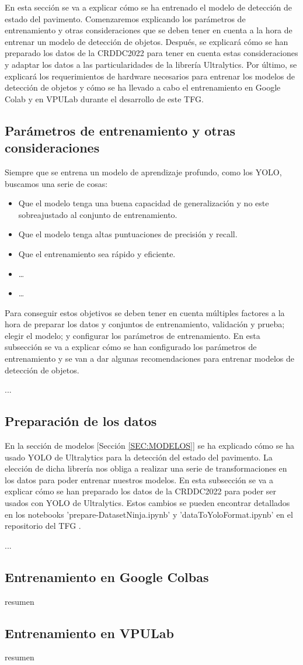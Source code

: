 En esta sección se va a explicar cómo se ha entrenado el modelo de detección de estado del pavimento. Comenzaremos explicando los parámetros de entrenamiento y otras consideraciones que se deben tener en cuenta a la hora de entrenar un modelo de detección de objetos. Después, se explicará cómo se han preparado los datos de la CRDDC2022 para tener en cuenta estas consideraciones y adaptar los datos a las particularidades de la librería Ultralytics. Por último, se explicará los requerimientos de hardware necesarios para entrenar los modelos de detección de objetos y cómo se ha llevado a cabo el entrenamiento en Google Colab y en VPULab durante el desarrollo de este TFG.

\subsection{Parámetros de entrenamiento y otras consideraciones}
Siempre que se entrena un modelo de aprendizaje profundo, como los YOLO, buscamos una serie de cosas:
\begin{itemize}
    \item Que el modelo tenga una buena capacidad de generalización y no este sobreajustado al conjunto de entrenamiento.
    \item Que el modelo tenga altas puntuaciones de precisión y recall.
    \item Que el entrenamiento sea rápido y eficiente.
    \item \dots
    \item \dots
\end{itemize}
Para conseguir estos objetivos se deben tener en cuenta múltiples factores a la hora de preparar los datos y conjuntos de entrenamiento, validación y prueba; elegir el modelo; y configurar los parámetros de entrenamiento. En esta subsección se va a explicar cómo se han configurado los parámetros de entrenamiento y se van a dar algunas recomendaciones para entrenar modelos de detección de objetos.

...

\subsection{Preparación de los datos}
En la sección de modelos [Sección \ref{SEC:MODELOS}] se ha explicado cómo se ha usado YOLO de Ultralytics para la detección del estado del pavimento. La elección de dicha librería nos obliga a realizar una serie de transformaciones en los datos para poder entrenar nuestros modelos. En esta subsección se va a explicar cómo se han preparado los datos de la CRDDC2022 para poder ser usados con YOLO de Ultralytics. Estos cambios se pueden encontrar detallados en los notebooks 'prepare-DatasetNinja.ipynb' y 'dataToYoloFormat.ipynb' en el repositorio del TFG \cite{TFG_Repository}.

...

\subsection{Entrenamiento en Google Colbas}
resumen

\subsection{Entrenamiento en VPULab}
resumen